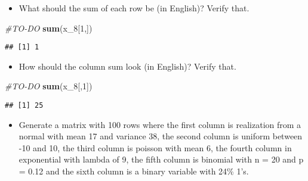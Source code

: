 \documentclass[]{article}
\newenvironment{Shaded}{\begin{snugshade}}{\end{snugshade}}
\newcommand{\KeywordTok}[1]{\textcolor[rgb]{0.13,0.29,0.53}{\textbf{#1}}}
\newcommand{\DecValTok}[1]{\textcolor[rgb]{0.00,0.00,0.81}{#1}}
\newcommand{\CommentTok}[1]{\textcolor[rgb]{0.56,0.35,0.01}{\textit{#1}}}
\newcommand{\NormalTok}[1]{#1}
\providecommand{\tightlist}{%
  \setlength{\itemsep}{0pt}\setlength{\parskip}{0pt}}
\begin{document}
\begin{itemize}
\tightlist
\item
  What should the sum of each row be (in English)? Verify that.
\end{itemize}

\begin{Shaded}
\begin{Highlighting}[]
\CommentTok{#TO-DO}
\KeywordTok{sum}\NormalTok{(x_}\DecValTok{8}\NormalTok{[}\DecValTok{1}\NormalTok{,])}
\end{Highlighting}
\end{Shaded}

\begin{verbatim}
## [1] 1
\end{verbatim}

\begin{itemize}
\tightlist
\item
  How should the column sum look (in English)? Verify that.
\end{itemize}

\begin{Shaded}
\begin{Highlighting}[]
\CommentTok{#TO-DO}
\KeywordTok{sum}\NormalTok{(x_}\DecValTok{8}\NormalTok{[,}\DecValTok{1}\NormalTok{])}
\end{Highlighting}
\end{Shaded}

\begin{verbatim}
## [1] 25
\end{verbatim}

\begin{itemize}
\tightlist
\item
  Generate a matrix with 100 rows where the first column is realization
  from a normal with mean 17 and variance 38, the second column is
  uniform between -10 and 10, the third column is poisson with mean 6,
  the fourth column in exponential with lambda of 9, the fifth column is
  binomial with n = 20 and p = 0.12 and the sixth column is a binary
  variable with 24\% 1's.
\end{itemize}
\end{document}

